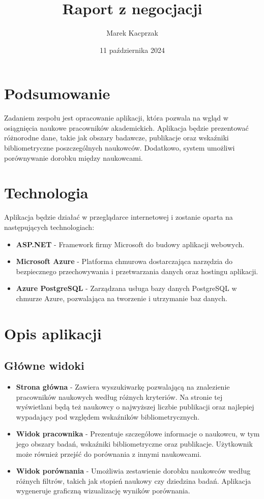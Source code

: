 \documentclass{article}
\title{Raport z negocjacji}
\author{Marek Kacprzak}
\date{11 października 2024}
\begin{document}
\maketitle

\tableofcontents

\section{Podsumowanie}
Zadaniem zespołu jest opracowanie aplikacji, która pozwala na wgląd w osiągnięcia naukowe pracowników akademickich. Aplikacja będzie prezentować różnorodne dane, takie jak obszary badawcze, publikacje oraz wskaźniki bibliometryczne poszczególnych naukowców. Dodatkowo, system umożliwi porównywanie dorobku między naukowcami.

\section{Technologia}
Aplikacja będzie działać w przeglądarce internetowej i zostanie oparta na następujących technologiach:
\begin{itemize}
  \item \textbf{ASP.NET} - Framework firmy Microsoft do budowy aplikacji webowych.
  \item \textbf{Microsoft Azure} - Platforma chmurowa dostarczająca narzędzia do bezpiecznego przechowywania i przetwarzania danych oraz hostingu aplikacji.
  \item \textbf{Azure PostgreSQL} - Zarządzana usługa bazy danych PostgreSQL w chmurze Azure, pozwalająca na tworzenie i utrzymanie baz danych.
\end{itemize}

\section{Opis aplikacji}
\subsection{Główne widoki}
\begin{itemize}
  \item \textbf{Strona główna} - Zawiera wyszukiwarkę pozwalającą na znalezienie pracowników naukowych według różnych kryteriów. Na stronie tej wyświetlani będą też naukowcy o najwyższej liczbie publikacji oraz najlepiej wypadający pod względem wskaźników bibliometrycznych.
  \item \textbf{Widok pracownika} - Prezentuje szczegółowe informacje o naukowcu, w tym jego obszary badań, wskaźniki bibliometryczne oraz publikacje. Użytkownik może również przejść do porównania z innymi naukowcami.
  \item \textbf{Widok porównania} - Umożliwia zestawienie dorobku naukowców według różnych filtrów, takich jak stopień naukowy czy dziedzina badań. Aplikacja wygeneruje graficzną wizualizację wyników porównania.
\end{itemize}
\end{document}
